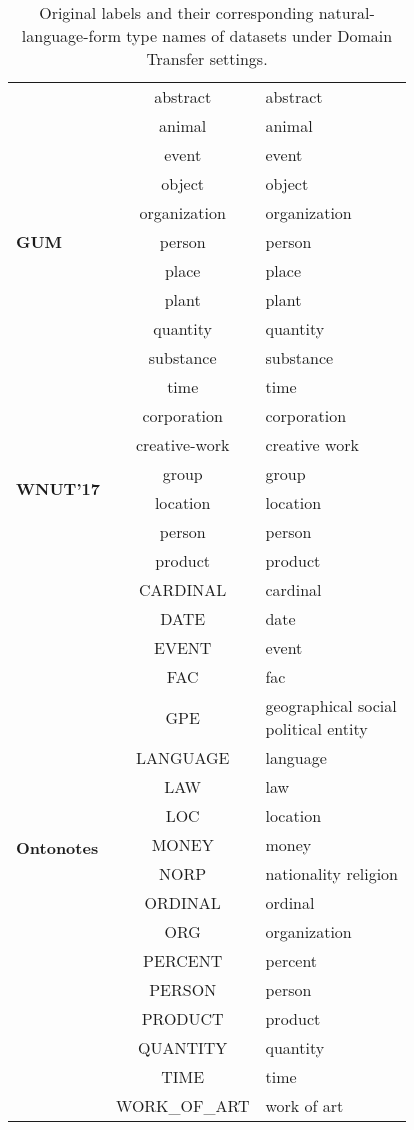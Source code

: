 \documentclass[11pt]{article}
\begin{document}
\begin{table}[htb]
\begin{center}
{\begin{tabular}{lcl}
\cmidrule(lr){1-1} \cmidrule(lr){2-3}
\multirow{11}{*}{\textbf{GUM} } 
& abstract & abstract \\
& animal & animal \\
& event & event \\
& object & object \\
& organization & organization \\
& person & person \\
& place & place \\
& plant & plant \\
& quantity & quantity \\
& substance & substance \\
& time & time \\


\cmidrule(lr){1-1} \cmidrule(lr){2-3}
\multirow{6}{*}{\textbf{WNUT'17} } 
& corporation & corporation \\
& creative-work & creative work \\
& group & group \\
& location & location \\
& person & person \\
& product & product \\


\cmidrule(lr){1-1} \cmidrule(lr){2-3}
\multirow{18}{*}{\textbf{Ontonotes} } 
& CARDINAL & cardinal \\
& DATE & date \\
& EVENT & event \\
& FAC & fac \\
& GPE & \makecell[l]{geographical social \\political entity} \\
& LANGUAGE & language \\
& LAW & law \\
& LOC & location \\
& MONEY & money \\
& NORP & nationality religion \\
& ORDINAL & ordinal \\
& ORG & organization \\
& PERCENT & percent \\
& PERSON & person \\
& PRODUCT & product \\
& QUANTITY & quantity \\
& TIME & time \\
& WORK\_OF\_ART & work of art \\


\bottomrule
\end{tabular}

}

\end{center}
\caption{Original labels and their corresponding natural-language-form type names of datasets under {Domain Transfer} settings.}
\label{tab:dataset_labels_nlf_2}
\end{table}
\end{document}
